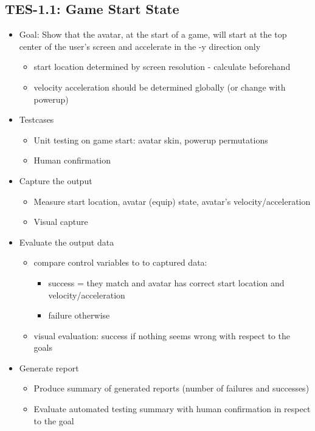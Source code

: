 \subsection{TES-1.1: Game Start State}
\begin{itemize}
\item Goal: Show that the avatar, at the start of a game, will start at the top center of the user\textquoteright{}s screen and accelerate in the -y direction only
\begin{itemize}
\item start location determined by screen resolution - calculate beforehand
\item velocity acceleration should be determined globally (or change with powerup)
\end{itemize}

\item Testcases
\begin{itemize}
\item Unit testing on game start: avatar skin, powerup permutations
\item Human confirmation
\end{itemize}

\item Capture the output
\begin{itemize}
\item Measure start location, avatar (equip) state, avatar’s velocity/acceleration
\item Visual capture
\end{itemize}

\item Evaluate the output data
\begin{itemize}
\item compare control variables to to captured data:
\begin{itemize}
\item success = they match and avatar has correct start location and velocity/acceleration
\item failure otherwise
\end{itemize}

\item visual evaluation: success if nothing seems wrong with respect to the goals
\end{itemize}

\item Generate report
\begin{itemize}
\item Produce summary of generated reports (number of failures and successes)
\item Evaluate automated testing summary with human confirmation in respect to the goal
\end{itemize}
\end{itemize}

